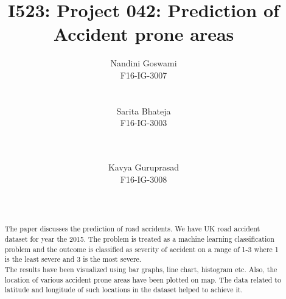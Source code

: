 \documentclass{acm_proc_article-sp}
\begin{document}
\title{I523: Project 042: Prediction of Accident prone areas}

\author{
\alignauthor
Nandini Goswami\\
F16-IG-3007\\
       \\
       \\
\alignauthor
Sarita Bhateja\\
F16-IG-3003\\
       \\
       \\
\and %
\alignauthor
Kavya Guruprasad\\
F16-IG-3008\\
       \\
       \\
}



\maketitle
\begin{abstract}

The paper discusses the prediction of road accidents. We have UK road accident dataset for year the 2015. The problem is treated as a machine learning classification problem and the outcome is classified as severity of accident on a range of 1-3 where 1 is the least severe and 3 is the most severe. \\
The results have been visualized using bar graphs, line chart, histogram etc. Also, the location of various accident prone areas have been plotted on map. The data related to latitude and longitude of such locations in the dataset helped to achieve it.
  
\end{abstract}
\end{document}
